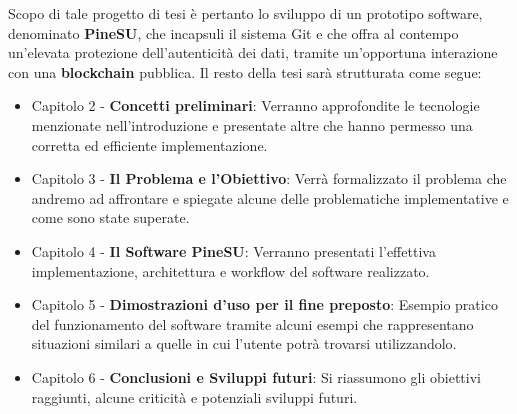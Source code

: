 Scopo di tale progetto di tesi è pertanto lo sviluppo di un prototipo software,
denominato \textbf{PineSU}, che incapsuli il sistema Git e che offra al contempo un'elevata
protezione dell'autenticità dei dati, tramite un'opportuna interazione con una \textbf{blockchain}
pubblica.
\thispagestyle{mystyle}
Il resto della tesi sarà strutturata come segue:
\begin{itemize}
    \item Capitolo 2 - \textbf{Concetti preliminari}: Verranno approfondite le tecnologie menzionate nell'introduzione e presentate altre che hanno permesso una corretta ed efficiente implementazione.
    \item Capitolo 3 - \textbf{Il Problema e l'Obiettivo}: Verrà formalizzato il problema che andremo ad affrontare e spiegate alcune delle problematiche implementative e come sono state superate.
    \item Capitolo 4 - \textbf{Il Software PineSU}: Verranno presentati l'effettiva implementazione, architettura e workflow del software realizzato.
    \item Capitolo 5 - \textbf{Dimostrazioni d'uso per il fine preposto}: Esempio pratico del funzionamento del software tramite alcuni esempi che rappresentano situazioni similari a quelle in cui l'utente potrà trovarsi utilizzandolo.
    \item Capitolo 6 - \textbf{Conclusioni e Sviluppi futuri}: Si riassumono gli obiettivi raggiunti, alcune criticità e potenziali sviluppi futuri.
\end{itemize}
